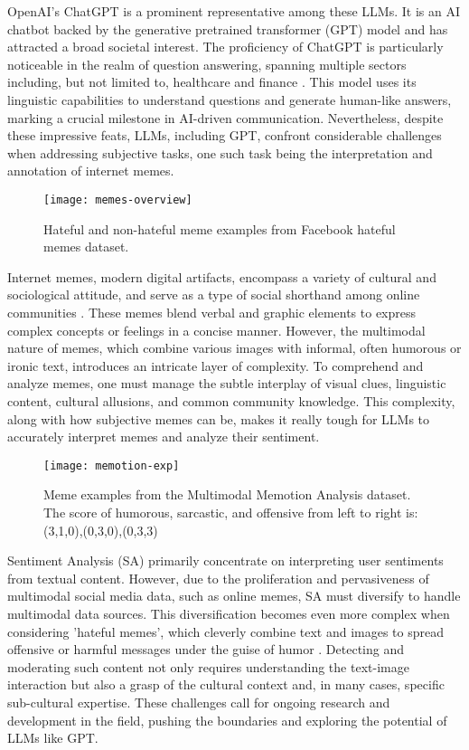\documentclass[conference]{IEEEtran}
\begin{document}
 OpenAI's ChatGPT \cite{openai2023} is a prominent representative among these LLMs. It is an AI chatbot backed by the generative pretrained transformer (GPT) model and has attracted a broad societal interest. The proficiency of ChatGPT is particularly noticeable in the realm of question answering, spanning multiple sectors including, but not limited to, healthcare \cite{jeblick2022chatgpt} and finance \cite{guo2023close}. This model uses its linguistic capabilities to understand questions and generate human-like answers, marking a crucial milestone in AI-driven communication. Nevertheless, despite these impressive feats, LLMs, including GPT, confront considerable challenges when addressing subjective tasks, one such task being the interpretation and annotation of internet memes. 

\begin{figure}[ht]
  \centering
  \texttt{[image: memes-overview]}
  \caption{Hateful and non-hateful meme examples from Facebook hateful memes dataset.}
\end{figure}
Internet memes, modern digital artifacts,  encompass a variety of cultural and sociological attitude, and serve as a type of social shorthand among online communities \cite{bauckhage2011insights, shifman2013memes}.  These memes blend verbal and graphic elements to express complex concepts or feelings in a concise manner. However, the multimodal nature of memes, which combine various images with informal, often humorous or ironic text, introduces an intricate layer of complexity. To comprehend and analyze memes, one must manage the subtle interplay of visual clues, linguistic content, cultural allusions, and common community knowledge. This complexity, along with how subjective memes can be, makes it really tough for LLMs to accurately interpret memes and analyze their sentiment. 

\begin{figure}[h]
  \centering
  \texttt{[image: memotion-exp]}
  \caption{Meme examples from the Multimodal Memotion Analysis dataset. The score of humorous, sarcastic, and offensive from left to right is: (3,1,0),(0,3,0),(0,3,3)}
  
\end{figure}

Sentiment Analysis (SA) primarily concentrate on interpreting user sentiments from textual content. However, due to the proliferation and pervasiveness of multimodal social media data, such as online memes, SA must diversify to handle multimodal data sources. This diversification becomes even more complex when considering 'hateful memes', which cleverly combine text and images to spread offensive or harmful messages under the guise of humor \cite{kiela2020hateful, suryawanshi2020multimodal, williams2016racial}. Detecting and moderating such content not only requires understanding the text-image interaction but also a grasp of the cultural context and, in many cases, specific sub-cultural expertise. These challenges call for ongoing research and development in the field, pushing the boundaries and exploring the potential of LLMs like GPT.
\end{document}
